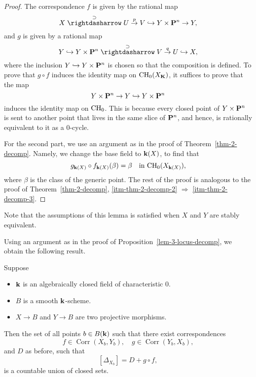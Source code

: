 \begin{proof}
    The correspondence $f$ is given by the rational map
    \[ X \overset{\supset}{\mathrel{\rightdasharrow}} U \overset{p}{\to} V \hookrightarrow Y \times \bbP^n \to Y, \]
    and $g$ is given by a rational map
    \[ Y \hookrightarrow Y \times \bbP^n \overset{\supset}{\mathrel{\rightdasharrow}} V \overset{q}{\to} U \hookrightarrow X, \]
    where the inclusion $Y \hookrightarrow Y \times \bbP^n$
    is chosen so that the composition is defined.
    To prove that $g \circ f$ induces the identity map on $\CH_0 (X_{\bbK})$, it suffices to prove that the map
    \[ Y \times \bbP^n \to Y \hookrightarrow Y \times \bbP^n \]
    induces the identity map on $\mathrm{CH}_0$. 
    This is because every closed point of $Y \times \bbP^n$
    is sent to another point that lives in the same slice of $\bbP^n$, and hence,
    is rationally equivalent to it as a $0$-cycle.

    For the second part, we use an argument as in the proof of Theorem~\ref{thm-2-decomp}.
    Namely, we change the base field to $\bbk(X)$, to find that
    \[ g_{\bbk (X)} \circ f_{\bbk (X)} (\beta) = \beta \quad \text{in } \CH_0 (X_{\bbk(X)}), \]
    where $\beta$ is the class of the generic point.
    The rest of the proof is analogous to the proof of Theorem~\ref{thm-2-decomp}, 
    \ref{itm-thm-2-decomp-2} $\Rightarrow$ \ref{itm-thm-2-decomp-3}.
\end{proof}

Note that the assumptions of this lemma is satisfied when $X$ and $Y$ are stably equivalent.

Using an argument as in the proof of Proposition~\ref{lem-3-locus-decomp},
we obtain the following result.

\begin{theorem} \label{thm-3-stable-eq-prototype}
    Suppose 
    \begin{itemize}
        \item
            $\bbk$ is an algebraically closed field of characteristic $0$.
        \item
            $B$ is a smooth $\bbk$-scheme.
        \item
            $X \to B$ and $Y \to B$ are two projective morphisms.
    \end{itemize}
    Then the set of all points $b \in B (\bbk)$ such that
    there exist correspondences
    \[ f \in \operatorname{Corr} ( X_b, Y_b ), \quad g \in \operatorname{Corr} ( Y_b, X_b ), \]
    and $D$ as before, such that 
    \[ [\Delta_{X_b}] = D + g \circ f, \]
    is a countable union of closed sets.
\end{theorem}


